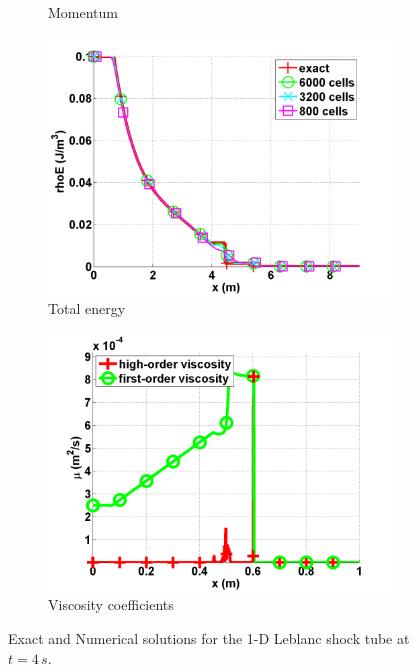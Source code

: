 \documentclass[preprint,10pt]{elsarticle}
\begin{document}
\begin{figure}[H]
\begin{subfigure}[b]{0.495\textwidth}
                \caption{Momentum}
                \label{fig:1d_leblanc_density}
        \end{subfigure}
        \begin{subfigure}[b]{0.495\textwidth}
                \centering
                \includegraphics[width=\textwidth]{Leblanc_exact_and_numerical_stt_total_energy_6000.png}
                \caption{Total energy}
                \label{fig:1d_leblanc_press}
        \end{subfigure}
        \begin{subfigure}[b]{0.495\textwidth}
                \centering
                \includegraphics[width=\textwidth]{Leblanc_viscosity_numerical_6000.png}
                \caption{Viscosity coefficients}
                \label{fig:1d_leblanc_visc}
        \end{subfigure}
        \caption{Exact and Numerical solutions for the 1-D Leblanc shock tube at $t=4\,s$.}\label{fig:1d_leblanc}
\end{figure}
\end{document}
